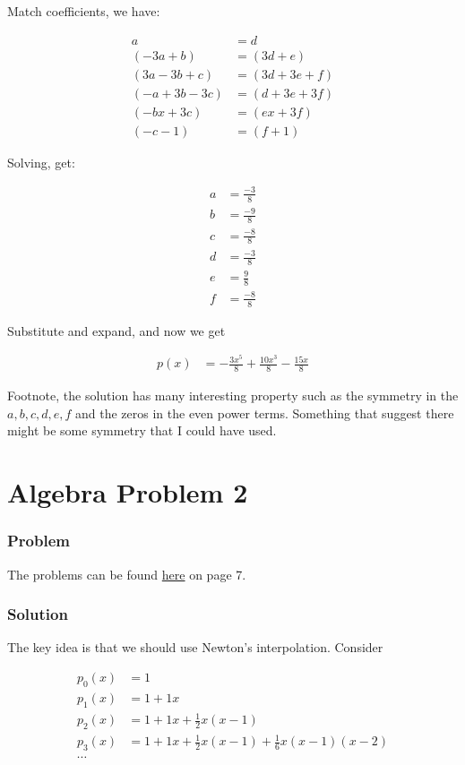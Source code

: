\documentclass{article}
\begin{document}
Match coefficients, we have:

\begin{align*}
               a &= d             \\
       (-3a + b) &=  (3d + e)     \\
   (3a - 3b + c) &= (3d + 3e + f) \\
  (-a + 3b - 3c) &= (d + 3e + 3f) \\
      (-bx + 3c) &= (ex + 3f)     \\
        (-c - 1) &= (f + 1)
\end{align*}

Solving, get:

\begin{align*}
  a &= \frac{-3}{8} \\
  b &= \frac{-9}{8} \\
  c &= \frac{-8}{8} \\
  d &= \frac{-3}{8} \\
  e &= \frac{ 9}{8} \\
  f &= \frac{-8}{8}
\end{align*}

Substitute and expand, and now we get

\begin{align*}
  p(x) &= -\frac{3x^5}{8} + \frac{10x^3}{8} - \frac{15x}{8}
\end{align*}

Footnote, the solution has many interesting property such as the symmetry in the $ a, b, c, d, e, f $ and the zeros in the even power terms. Something that suggest there might be some symmetry that I could have used.

\section*{Algebra Problem 2}
\subsubsection*{Problem}
The problems can be found \href{https://www.math.hkust.edu.hk/~makyli/190_2010Sp/problemBk.pdf}{here} on page 7.

\subsubsection*{Solution}
The key idea is that we should use Newton's interpolation. Consider 

\begin{align*}
  p_0(x) &= 1 \\
  p_1(x) &= 1 + 1x \\
  p_2(x) &= 1 + 1x + \frac{1}{2}x(x-1) \\
  p_3(x) &= 1 + 1x + \frac{1}{2}x(x-1) + \frac{1}{6}x(x-1)(x-2)\\
  \cdots
\end{align*}
\end{document}
